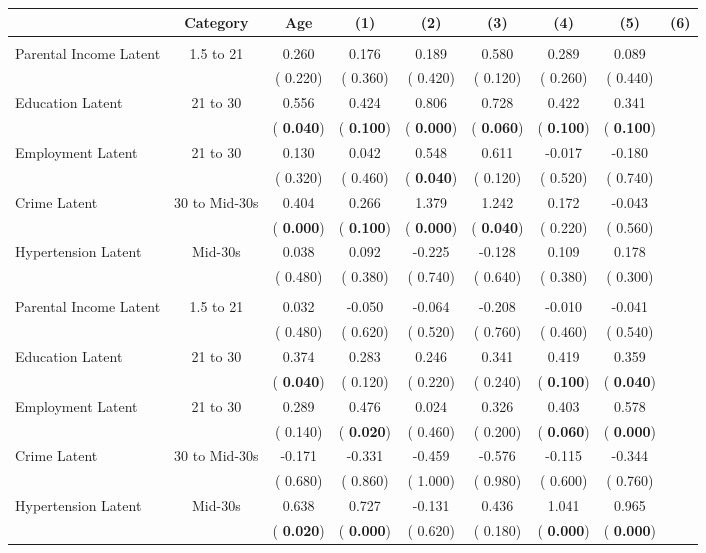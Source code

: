 \begin{tabular}{l c c c c c c c}
\toprule
 & Category & Age & (1) & (2) & (3) & (4) & (5) & (6) \\
\midrule
{} \\
Parental Income Latent & 1.5 to 21 &     0.260 &     0.176 &     0.189 &     0.580 &     0.289 &     0.089 \\
&  & (    0.220) & (    0.360) & (    0.420) & (    0.120) & (    0.260) & (    0.440) \\
Education Latent & 21 to 30 &     0.556 &     0.424 &     0.806 &     0.728 &     0.422 &     0.341 \\
&  & (\textbf{    0.040}) & (\textbf{    0.100}) & (\textbf{    0.000}) & (\textbf{    0.060}) & (\textbf{    0.100}) & (\textbf{    0.100}) \\
Employment Latent & 21 to 30 &     0.130 &     0.042 &     0.548 &     0.611 &    -0.017 &    -0.180 \\
&  & (    0.320) & (    0.460) & (\textbf{    0.040}) & (    0.120) & (    0.520) & (    0.740) \\
Crime Latent & 30 to Mid-30s &     0.404 &     0.266 &     1.379 &     1.242 &     0.172 &    -0.043 \\
&  & (\textbf{    0.000}) & (\textbf{    0.100}) & (\textbf{    0.000}) & (\textbf{    0.040}) & (    0.220) & (    0.560) \\
Hypertension Latent & Mid-30s &     0.038 &     0.092 &    -0.225 &    -0.128 &     0.109 &     0.178 \\
&  & (    0.480) & (    0.380) & (    0.740) & (    0.640) & (    0.380) & (    0.300) \\
\midrule
{} \\
Parental Income Latent & 1.5 to 21 &     0.032 &    -0.050 &    -0.064 &    -0.208 &    -0.010 &    -0.041 \\
&  & (    0.480) & (    0.620) & (    0.520) & (    0.760) & (    0.460) & (    0.540) \\
Education Latent & 21 to 30 &     0.374 &     0.283 &     0.246 &     0.341 &     0.419 &     0.359 \\
&  & (\textbf{    0.040}) & (    0.120) & (    0.220) & (    0.240) & (\textbf{    0.100}) & (\textbf{    0.040}) \\
Employment Latent & 21 to 30 &     0.289 &     0.476 &     0.024 &     0.326 &     0.403 &     0.578 \\
&  & (    0.140) & (\textbf{    0.020}) & (    0.460) & (    0.200) & (\textbf{    0.060}) & (\textbf{    0.000}) \\
Crime Latent & 30 to Mid-30s &    -0.171 &    -0.331 &    -0.459 &    -0.576 &    -0.115 &    -0.344 \\
&  & (    0.680) & (    0.860) & (    1.000) & (    0.980) & (    0.600) & (    0.760) \\
Hypertension Latent & Mid-30s &     0.638 &     0.727 &    -0.131 &     0.436 &     1.041 &     0.965 \\
&  & (\textbf{    0.020}) & (\textbf{    0.000}) & (    0.620) & (    0.180) & (\textbf{    0.000}) & (\textbf{    0.000}) \\
\bottomrule
\end{tabular}
